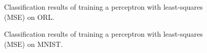 \documentclass[journal]{IEEEtran}
\begin{document}
\begin{figure}[H]
	\centering
	\caption{Classification results of training a perceptron with least-squares (MSE) on ORL.}
	\label{fig:orlperceptronmse}
\end{figure}

\begin{figure}[H]
	\centering
	\caption{Classification results of training a perceptron with least-squares (MSE) on MNIST.}
	\label{fig:mnistperceptronmse}
\end{figure}
\end{document}
